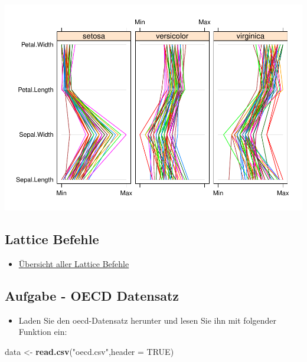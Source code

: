 \documentclass[]{article}
\newenvironment{Shaded}{\begin{snugshade}}{\end{snugshade}}
\newcommand{\KeywordTok}[1]{\textcolor[rgb]{0.13,0.29,0.53}{\textbf{{#1}}}}
\newcommand{\DataTypeTok}[1]{\textcolor[rgb]{0.13,0.29,0.53}{{#1}}}
\newcommand{\StringTok}[1]{\textcolor[rgb]{0.31,0.60,0.02}{{#1}}}
\newcommand{\OtherTok}[1]{\textcolor[rgb]{0.56,0.35,0.01}{{#1}}}
\newcommand{\NormalTok}[1]{{#1}}
\providecommand{\tightlist}{%
  \setlength{\itemsep}{0pt}\setlength{\parskip}{0pt}}
\begin{document}
\includegraphics{Intro_Datenanalyse1_files/figure-latex/unnamed-chunk-182-1.pdf}

\subsection{Lattice Befehle}\label{lattice-befehle}

\begin{itemize}
\tightlist
\item
  \href{http://www.isid.ac.in/~deepayan/R-tutorials/labs/04_lattice_lab.pdf}{Übersicht
  aller Lattice Befehle}
\end{itemize}

\subsection{Aufgabe - OECD Datensatz}\label{aufgabe---oecd-datensatz}

\begin{itemize}
\tightlist
\item
  Laden Sie den oecd-Datensatz herunter und lesen Sie ihn mit folgender
  Funktion ein:
\end{itemize}

\begin{Shaded}
\begin{Highlighting}[]
\NormalTok{data <-}\StringTok{ }\KeywordTok{read.csv}\NormalTok{(}\StringTok{"oecd.csv"}\NormalTok{,}\DataTypeTok{header =} \OtherTok{TRUE}\NormalTok{)}
\end{Highlighting}
\end{Shaded}
\end{document}
